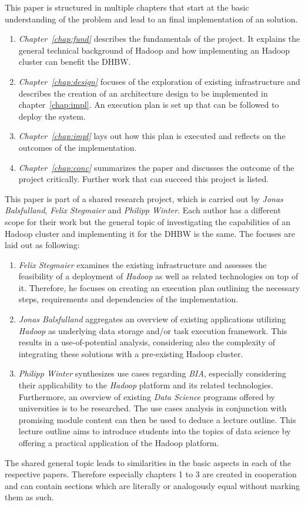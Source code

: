 This paper is structured in multiple chapters that start at the basic understanding of the problem 
and lead to an final implementation of an solution.

\begin{enumerate}
    \item \emph{Chapter~\ref{chap:fund}} describes the fundamentals of the project. 
        It explains the general technical background of Hadoop 
        and how implementing an Hadoop cluster can benefit the \ac{DHBW}. 
    \item \emph{Chapter~\ref{chap:design}} focuses of the exploration of existing
        infrastructure and describes the creation of an architecture design 
        to be implemented in chapter~\ref{chap:impl}. 
        An execution plan is set up that can be followed to deploy the system.
    \item \emph{Chapter~\ref{chap:impl}} lays out how this plan is executed 
        and reflects on the outcomes of the implementation. 
    \item \emph{Chapter~\ref{chap:conc}} summarizes the paper 
        and discusses the outcome of the project critically.
        Further work that can succeed this project is listed.
\end{enumerate}

This paper is part of a shared research project,
which is carried out by \emph{Jonas Balsfulland}, \emph{Felix Stegmaier} and \emph{Philipp Winter}.
Each author has a different scope for their work 
but the general topic of investigating the capabilities of an Hadoop cluster 
and implementing it for the \ac{DHBW} is the same.
The focuses are laid out as following:

\begin{enumerate}
	\item \emph{Felix Stegmaier} examines the existing infrastructure and assesses the feasibility of a deployment of \emph{Hadoop} as well as related technologies on top of it. Therefore, he focuses on creating an execution plan outlining the necessary steps, requirements and dependencies of the implementation.
	\item \emph{Jonas Balsfulland} aggregates an overview of existing applications utilizing \emph{Hadoop} as underlying data storage and/or task execution framework. This results in a use-of-potential analysis, considering also the complexity of integrating these solutions with a pre-existing Hadoop cluster.
	\item \emph{Philipp Winter} synthesizes use cases regarding \emph{\ac{BIA}}, especially considering their applicability to the \emph{Hadoop} platform and its related technologies. Furthermore, an overview of existing \emph{Data Science} programs offered by universities is to be researched. The use cases analysis in conjunction with promising module content can then be used to deduce a lecture outline. This lecture outline aims to introduce students into the topics of data science by offering a practical application of the Hadoop platform.
\end{enumerate}

The shared general topic leads to similarities in the basic aspects in each of the respective papers.
Therefore especially chapters 1 to 3 are created in cooperation 
and can contain sections which are literally or analogously equal without marking them as such.
